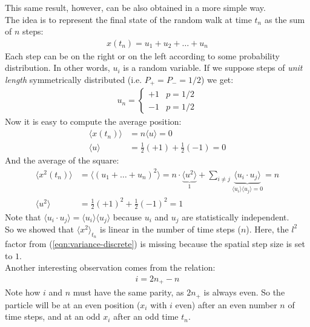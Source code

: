 \documentclass[../template.tex]{subfiles}
\begin{document}
This same result, however, can be also obtained in a more simple way.\\
The idea is to represent the final state of the random walk at time $t_n$ as the sum of $n$ steps:
\begin{align*}
    x(t_n) = u_1 + u_2 + \dots + u_n
\end{align*}
Each step can be on the right or on the left according to some probability distribution. In other words, $u_i$ is a random variable. If we suppose steps of \textit{unit length} symmetrically distributed (i.e. $P_+ = P_- = 1/2$) we get:  
\begin{align*}
    u_n = \begin{cases}
        +1 & p = 1/2\\
        -1 & p = 1/2
    \end{cases}
\end{align*} 
Now it is easy to compute the average position:
\begin{align*}
    \langle x(t_n) \rangle &= n\langle u \rangle = 0\\
    \langle u \rangle &= \frac{1}{2} (+1) + \frac{1}{2} (-1) = 0  
\end{align*}
And the average of the square: 
\begin{align*}
    \langle x^2 (t_n)\rangle &= \langle (u_1 + \dots + u_n)^2 \rangle = n\cdot \underbrace{\langle u^2 \rangle}_{1} + \sum_{i\neq j} 
    \underbrace{\langle u_i \cdot u_j \rangle}_{\langle u_i \rangle \langle u_j\rangle = 0} = n\\
    \langle u^2 \rangle &= \frac{1}{2}(+1)^2 + \frac{1}{2}(-1)^2 = 1  
\end{align*}
Note that $\langle u_i \cdot u_j \rangle = \langle u_i \rangle \langle u_j \rangle$ because $u_i$ and $u_j$ are statistically independent.\\
So we showed that $\langle x^2 \rangle_{t_n}$ is linear in the number of time steps ($n$). Here, the $l^2$ factor from (\ref{eqn:variance-discrete}) is missing because the spatial step size is set to $1$.\\

Another interesting observation comes from the relation:
\begin{align*}
    i = 2n_+ - n
\end{align*}
Note how $i$ and $n$ must have the same parity, as $2n_+$ is always even. So the particle will be at an even position ($x_i$ with $i$ even) after an even number $n$ of time steps, and at an odd $x_i$ after an odd time $t_n$.
\end{document}
